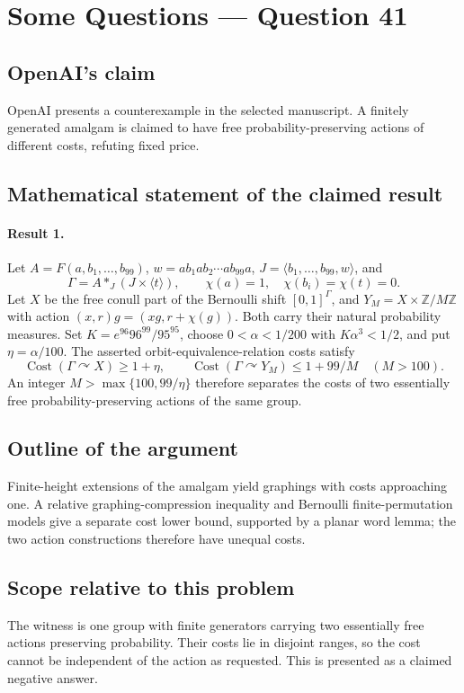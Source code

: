 \documentclass[11pt]{article}
\begin{document}
\section*{Some Questions — Question 41}

\subsection{OpenAI's claim}
OpenAI presents a counterexample in the selected manuscript. A finitely generated amalgam is claimed to have free probability-preserving actions of different costs, refuting fixed price.

\subsection{Mathematical statement of the claimed result}
\paragraph{Result 1.} Let \(A=F(a,b_1,\ldots,b_{99})\), \(w=ab_1ab_2\cdots ab_{99}a\), \(J=\langle b_1,\ldots,b_{99},w\rangle\), and
\[
 \Gamma=A*_J(J\times\langle t\rangle),\qquad\chi(a)=1,\quad\chi(b_i)=\chi(t)=0.
\]
Let \(X\) be the free conull part of the Bernoulli shift \([0,1]^\Gamma\), and \(Y_M=X\times\mathbb Z/M\mathbb Z\) with action \((x,r)g=(xg,r+\chi(g))\). Both carry their natural probability measures. Set \(K=e^{96}96^{99}/95^{95}\), choose \(0<\alpha<1/200\) with \(K\alpha^3<1/2\), and put \(\eta=\alpha/100\). The asserted orbit-equivalence-relation costs satisfy
\[
 \operatorname{Cost}(\Gamma\curvearrowright X)\ge1+\eta,\qquad
 \operatorname{Cost}(\Gamma\curvearrowright Y_M)\le1+99/M\quad(M>100).
\]
An integer \(M>\max\{100,99/\eta\}\) therefore separates the costs of two essentially free probability-preserving actions of the same group.

\subsection{Outline of the argument}
Finite-height extensions of the amalgam yield graphings with costs approaching one. A relative graphing-compression inequality and Bernoulli finite-permutation models give a separate cost lower bound, supported by a planar word lemma; the two action constructions therefore have unequal costs.

\subsection{Scope relative to this problem}
The witness is one group with finite generators carrying two essentially free actions preserving probability. Their costs lie in disjoint ranges, so the cost cannot be independent of the action as requested. This is presented as a claimed negative answer.
\end{document}
